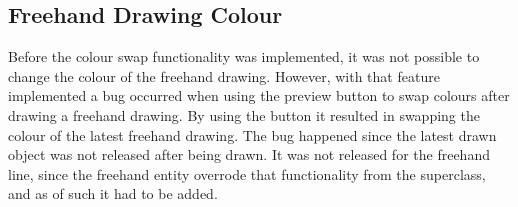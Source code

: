 \subsection{Freehand Drawing Colour}
Before the colour swap functionality was implemented, it was not possible to change the colour of the freehand drawing.
However, with that feature implemented a bug occurred when using the preview button to swap colours after drawing a freehand drawing. 
By using the button it resulted in swapping the colour of the latest freehand drawing. 
The bug happened since the latest drawn object was not released after being drawn.
It was not released for the freehand line, since the freehand entity overrode that functionality from the superclass, and as of such it had to be added.